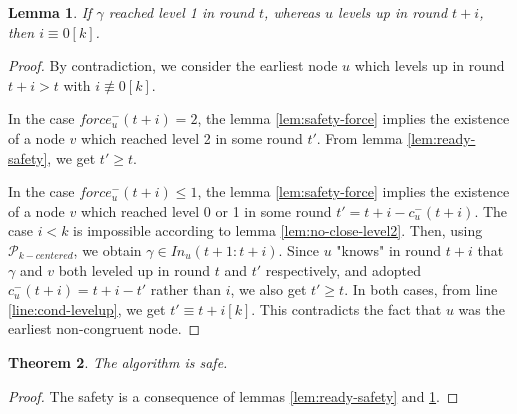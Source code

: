 \documentclass[11pt,letterpaper]{article}
\newtheorem{thm}{Theorem}
\newtheorem{lem}[thm]{Lemma}
\newcommand{\cent}{\gamma}
\begin{document}
\begin{lem} \label{lem:later-level1}
	If $\cent$ reached level 1 in round $t$, whereas $u$ levels up in round $t+i$, then $i \equiv 0 [k]$. 
\end{lem}
\begin{proof}
	By contradiction, we consider the earliest node $u$ which levels up in round $t+i > t$ with $i \not\equiv 0 [k]$.

	In the case $force_u^{-}(t+i) = 2$, the lemma \ref{lem:safety-force} implies the existence of a node $v$ which reached level 2 in some round $t'$. 
	From lemma \ref{lem:ready-safety}, we get $t' \geq t$.

	In the case $force_u^{-}(t+i) \leq 1$, the lemma \ref{lem:safety-force} implies the existence of a node $v$ which reached level 0 or 1 in some round $t' = t+i-c_u^{-}(t+i)$. 
	The case $i < k$ is impossible according to lemma \ref{lem:no-close-level2}.
	Then, using $\mathcal{P}_{k-centered}$, we obtain $\cent \in In_u(t+1:t+i)$.
	Since $u$ "knows" in round $t+i$ that $\cent$ and $v$ both leveled up in round $t$ and $t'$ respectively, and adopted $c_u^{-}(t+i) = t+i-t'$ rather than $i$,
	we also get $t' \geq t$.
	In both cases, from line \ref{line:cond-levelup}, we get $t' \equiv t+i [k]$.
	This contradicts the fact that $u$ was the earliest non-congruent node.
\end{proof}

\begin{thm} \label{lem:safety} 
	The algorithm is safe.
\end{thm}
\begin{proof}
	The safety is a consequence of lemmas \ref{lem:ready-safety} and \ref{lem:later-level1}.
\end{proof}
\end{document}
